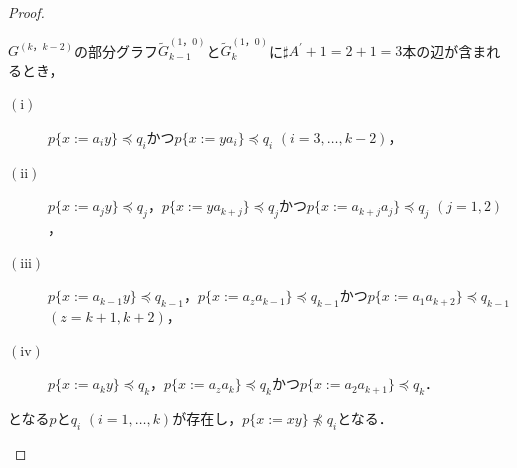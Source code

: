 \begin{proof}
\begin{ex}\label{少なくなるとき}
${G}^{(k，k-2)}$の部分グラフ$\tilde{G}^{(1，0)}_{k-1}$と$\tilde{G}^{(1，0)}_{k}$に$\sharp A^{\prime}+1=2+1=3$本の辺が含まれるとき，
\begin{description}
\item[$(\mathrm{i})$] $p \{ x:= a_{i}y \} \preceq q_{i}$かつ$p \{ x:= ya_{i} \} \preceq q_{i}$ $(i=3, \ldots , k-2)$，
\item[$(\mathrm{ii})$] $p \{ x:=a_{j}y \} \preceq q_{j}，p \{ x:=ya_{k+j} \} \preceq q_{j}$かつ$p \{ x:=a_{k+j}a_{j} \} \preceq q_{j}$ $(j=1,2)$，
\item[$(\mathrm{iii})$] $p \{ x:=a_{k-1}y \} \preceq q_{k-1}，p \{ x:=a_{z}a_{k-1} \} \preceq q_{k-1}$かつ$p \{ x:=a_{1}a_{k+2} \} \preceq q_{k-1}$ \\$(z=k+1,k+2)$，
\item[$(\mathrm{iv})$] $p \{ x:=a_{k}y \} \preceq q_{k}，p \{ x:=a_{z}a_{k} \} \preceq q_{k}$かつ$p \{ x:=a_{2}a_{k+1} \} \preceq q_{k}$．
\end{description}
となる$p$と$q_{i}$ $(i=1,\ldots,k)$が存在し，$p \{ x:=xy \} \not \preceq q_{i}$となる．
\end{ex}


\end{proof}
